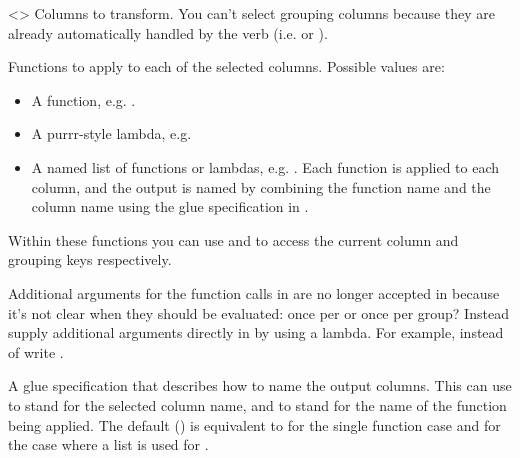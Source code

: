\documentclass[a4paper]{book}
\begin{document}
\begin{Arguments}
\begin{ldescription}
\item[\code{.cols}] <> Columns to transform.
You can't select grouping columns because they are already automatically
handled by the verb (i.e.  or ).

\item[\code{.fns}] Functions to apply to each of the selected columns.
Possible values are:
\begin{itemize}

\item{} A function, e.g. .
\item{} A purrr-style lambda, e.g. 
\item{} A named list of functions or lambdas, e.g.
. Each function is applied
to each column, and the output is named by combining the function name
and the column name using the glue specification in .

\end{itemize}


Within these functions you can use  and 
to access the current column and grouping keys respectively.

\item[\code{...}] \strong{[Deprecated]}

Additional arguments for the function calls in  are no longer
accepted in  because it's not clear when they should be evaluated:
once per  or once per group? Instead supply additional arguments
directly in  by using a lambda. For example, instead of
 write
.

\item[\code{.names}] A glue specification that describes how to name the output
columns. This can use  to stand for the selected column name, and
 to stand for the name of the function being applied. The default
() is equivalent to  for the single function case and
 for the case where a list is used for .


\end{ldescription}
\end{Arguments}
\end{document}
